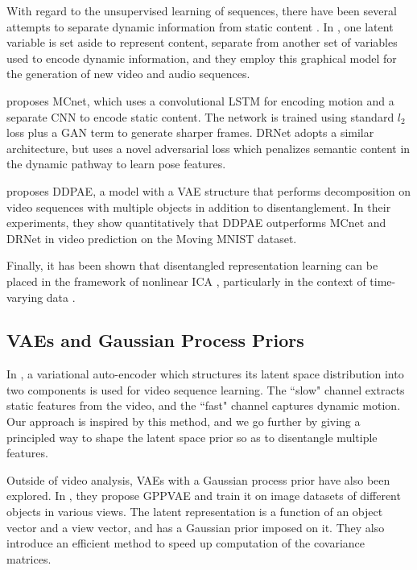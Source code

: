 \documentclass[runningheads]{llncs}
\begin{document}
   With regard to the unsupervised learning of sequences, there have been several attempts to separate dynamic information from static content \cite{Denton2017UnsupervisedLO,Grathwohl2016DisentanglingSA,Hsieh2018LearningTD,Li2018DisentangledSA,Villegas2017DecomposingMA}. In \cite{Li2018DisentangledSA}, one latent variable is set aside to represent content, separate from another set of variables used to encode dynamic information, and they employ this graphical model for the generation of new video and audio sequences.

   \cite{Villegas2017DecomposingMA} proposes MCnet, which uses a convolutional LSTM for encoding motion and a separate CNN to encode static content. The network is trained using standard $l_2$ loss plus a GAN term to generate sharper frames. DRNet \cite{Denton2017UnsupervisedLO} adopts a similar architecture, but uses a novel adversarial loss which penalizes semantic content in the dynamic pathway to learn pose features. \par 
   
   \cite{Hsieh2018LearningTD} proposes DDPAE, a model with a VAE structure that performs decomposition on video sequences with multiple objects in addition to disentanglement. In their experiments, they show quantitatively that DDPAE outperforms MCnet and DRNet in video prediction on the Moving MNIST dataset. \par 
   
   Finally, it has been shown that disentangled representation learning can be placed in the framework of nonlinear ICA \cite{Kingma2020}, particularly in the context of time-varying data \cite{Hyvarinen2016}.
   
   \subsection{VAEs and Gaussian Process Priors} 
   In \cite{Grathwohl2016DisentanglingSA}, a variational auto-encoder which structures its latent space distribution into two components is used for video sequence learning. The ``slow" channel extracts static features from the video, and the ``fast" channel captures dynamic motion. Our approach is inspired by this method, and we go further by giving a principled way to shape the latent space prior so as to disentangle multiple features. \par 
   
   Outside of video analysis, VAEs with a Gaussian process prior have also been explored. In \cite{Casale2018GaussianPP}, they propose GPPVAE and train it on image datasets of different objects in various views. The latent representation is a function of an object vector and a view vector, and has a Gaussian prior imposed on it. They also introduce an efficient method to speed up computation of the covariance matrices. \par 
   
\end{document}
